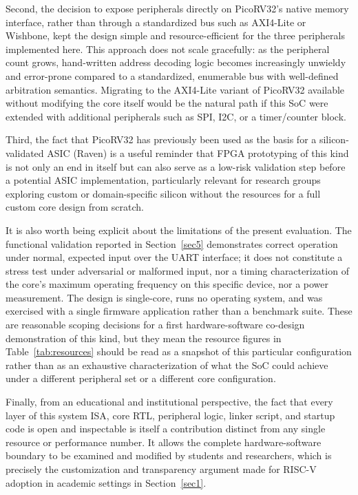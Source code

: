 \documentclass[runningheads]{llncs}
\begin{document}
Second, the decision to expose peripherals directly on PicoRV32's native memory interface, rather than through a standardized bus such as AXI4-Lite or Wishbone, kept the design simple and resource-efficient for the three peripherals implemented here. This approach does not scale gracefully: as the peripheral count grows, hand-written address decoding logic becomes increasingly unwieldy and error-prone compared to a standardized, enumerable bus with well-defined arbitration semantics. Migrating to the AXI4-Lite variant of PicoRV32  available without modifying the core itself \cite{wolf2019picorv32}  would be the natural path if this SoC were extended with additional peripherals such as SPI, I2C, or a timer/counter block.

Third, the fact that PicoRV32 has previously been used as the basis for a silicon-validated ASIC (Raven) is a useful reminder that FPGA prototyping of this kind is not only an end in itself but can also serve as a low-risk validation step before a potential ASIC implementation, particularly relevant for research groups exploring custom or domain-specific silicon without the resources for a full custom core design from scratch.

It is also worth being explicit about the limitations of the present evaluation. The functional validation reported in Section~\ref{sec5} demonstrates correct operation under normal, expected input over the UART interface; it does not constitute a stress test under adversarial or malformed input, nor a timing characterization of the core's maximum operating frequency on this specific device, nor a power measurement. The design is single-core, runs no operating system, and was exercised with a single firmware application rather than a benchmark suite. These are reasonable scoping decisions for a first hardware-software co-design demonstration of this kind, but they mean the resource figures in Table~\ref{tab:resources} should be read as a snapshot of this particular configuration rather than as an exhaustive characterization of what the SoC could achieve under a different peripheral set or a different core configuration.

Finally, from an educational and institutional perspective, the fact that every layer of this system  ISA, core RTL, peripheral logic, linker script, and startup code  is open and inspectable is itself a contribution distinct from any single resource or performance number. It allows the complete hardware-software boundary to be examined and modified by students and researchers, which is precisely the customization and transparency argument made for RISC-V adoption in academic settings in Section~\ref{sec1}.
\end{document}
